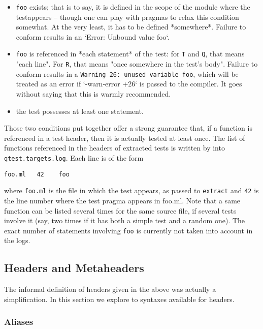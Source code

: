 \documentclass[a4paper,12pt]{article}
\begin{document}
\begin{itemize}

\item  \texttt{foo} exists; that is to say, it is defined in the scope of the module where the testappears -- though one can play with pragmas to relax this condition somewhat. At the very
least, it has to be defined *somewhere*. Failure to conform results in an `Error: Unbound
value foo`.

\item  \texttt{foo} is referenced in *each statement* of the test: for \texttt{T} and \texttt{Q}, that means "each
line". For \texttt{R}, that means "once somewhere in the test's body". Failure to conform results
in a \texttt{Warning 26: unused variable foo}, which will be treated as an error if `-warn-error
+26` is passed to the compiler. It goes without saying that this is warmly recommended.

\item  the test possesses at least one statement.
\end{itemize}

Those two conditions put together offer a strong guarantee that, if a function is
referenced in a test header, then it is actually tested at least once. The list of
functions referenced in the headers of extracted tests is written by \qtest{} into
\texttt{qtest.targets.log}. Each line is of the form

\begin{verbatim}
foo.ml   42    foo
\end{verbatim}

where \texttt{foo.ml} is the file in which the test appears, as passed to \texttt{extract} and \texttt{42} is
the line number where the test pragma appears in foo.ml. Note that a same function can be
listed several times for the same source file, if several tests involve it (say, two times
if it has both a simple test and a random one). The exact number of statements involving
\texttt{foo} is currently not taken into account in the logs.

\subsection{Headers and Metaheaders}

The informal definition of headers given in the above was actually a simplification. In
this section we explore to syntaxes available for headers.

\subsubsection{Aliases}
\end{document}
